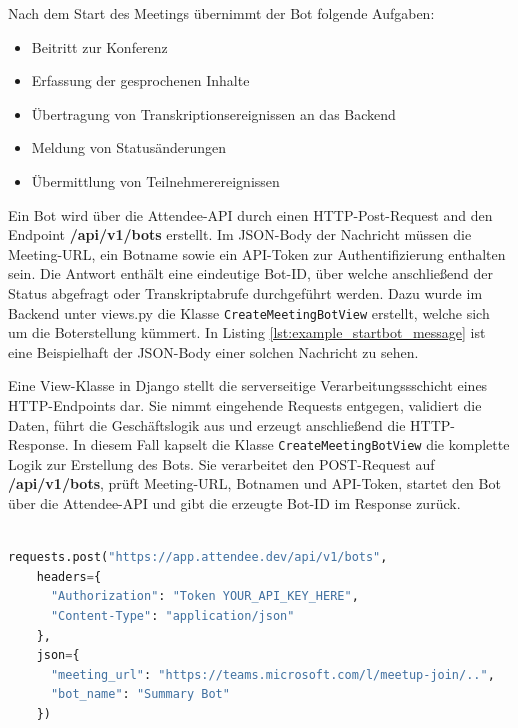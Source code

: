 Nach dem Start des Meetings übernimmt der Bot folgende Aufgaben: 
\begin{itemize}
    \item Beitritt zur Konferenz
    \item Erfassung der gesprochenen Inhalte
    \item Übertragung von Transkriptionsereignissen an das Backend
    \item Meldung von Statusänderungen
    \item Übermittlung von Teilnehmerereignissen
\end{itemize}

Ein Bot wird über die Attendee-API durch einen HTTP-Post-Request and den Endpoint \textbf{/api/v1/bots} erstellt. Im JSON-Body der Nachricht müssen die Meeting-URL, ein Botname sowie ein API-Token zur Authentifizierung enthalten sein. Die Antwort enthält eine eindeutige Bot-ID, über welche anschließend der Status abgefragt oder Transkriptabrufe durchgeführt werden. Dazu wurde im Backend unter views.py die Klasse \texttt{CreateMeetingBotView} erstellt, welche sich um die Boterstellung kümmert. In Listing \ref{lst:example_startbot_message} ist eine Beispielhaft der JSON-Body einer solchen Nachricht zu sehen.

Eine View-Klasse in Django stellt die serverseitige Verarbeitungssschicht eines HTTP-Endpoints dar. Sie nimmt eingehende Requests entgegen, validiert die Daten, führt die Geschäftslogik aus und erzeugt anschließend die HTTP-Response. In diesem Fall kapselt die Klasse \texttt{CreateMeetingBotView} die komplette Logik zur Erstellung des Bots. Sie verarbeitet den POST-Request auf \textbf{/api/v1/bots}, prüft Meeting-URL, Botnamen und API-Token, startet den Bot über die Attendee-API und gibt die erzeugte Bot-ID im Response zurück.
\newpage

\begin{lstlisting}[language=python, style=pythonstyle caption=Beispielhafte Nachricht zum Starten eines Bots, label=lst:example_startbot_message]

requests.post("https://app.attendee.dev/api/v1/bots",
    headers={
      "Authorization": "Token YOUR_API_KEY_HERE",
      "Content-Type": "application/json"
    },
    json={
      "meeting_url": "https://teams.microsoft.com/l/meetup-join/..",
      "bot_name": "Summary Bot"
    })

\end{lstlisting}

